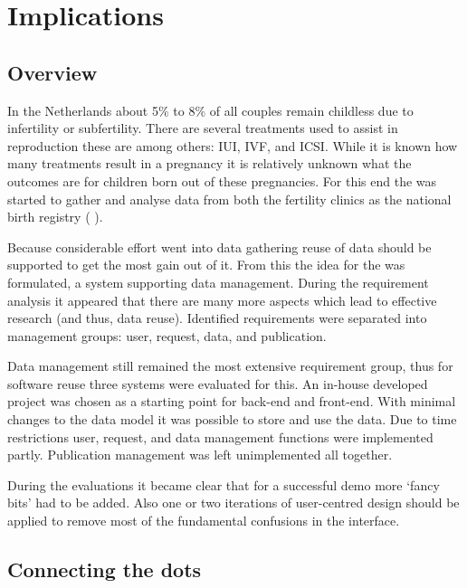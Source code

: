 \section{Implications}

\subsection{Overview}

In the Netherlands about 5\% to 8\% of all couples remain childless due to infertility or subfertility.
There are several treatments used to assist in reproduction these are among others: IUI, IVF, and ICSI.
While it is known how many treatments result in a pregnancy it is relatively unknown what the outcomes are for children born out of these pregnancies.
For this end the \project{} was started to gather and analyse data from both the fertility clinics as the national birth registry (\ie{} \PRN{}).

Because considerable effort went into data gathering reuse of data should be supported to get the most gain out of it.
From this the idea for the \ivfsystem{} was formulated, a system supporting data management.
During the requirement analysis it appeared that there are many more aspects which lead to effective research (and thus, data reuse).
Identified requirements were separated into management groups: user, request, data, and publication.

Data management still remained the most extensive requirement group, thus for software reuse three systems were evaluated for this.
An in-house developed project was chosen as a starting point for back-end and front-end.
With minimal changes to the data model it was possible to store and use the \project{} data.
Due to time restrictions user, request, and data management functions were implemented partly.
Publication management was left unimplemented all together.

During the evaluations it became clear that for a successful demo more `fancy bits' had to be added.
Also one or two iterations of user-centred design should be applied to remove most of the fundamental confusions in the interface.

\subsection{Connecting the dots}


